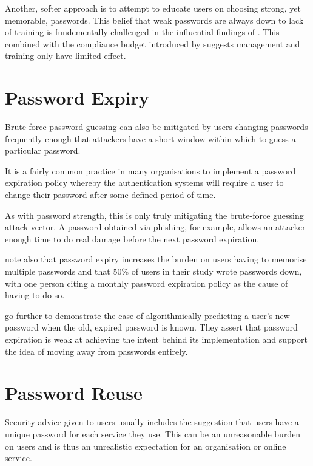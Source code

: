 \documentclass{report}
\begin{document}
Another, softer approach is to attempt to educate users
on choosing strong, yet memorable, passwords. This belief
that weak passwords are always down to lack of training
is fundementally challenged in the influential findings
of \textcite{adams1999users}. This combined with the
compliance budget introduced by \textcite{beautement2009compliance}
suggests management and training only have limited effect.

\section{Password Expiry}

Brute-force password guessing can also be mitigated by
users changing passwords frequently enough that attackers
have a short window within which to guess a particular
password.

It is a fairly common practice in many organisations to
implement a password expiration policy whereby the
authentication systems will require a user to change their
password after some defined period of time.

As with password strength, this is only truly mitigating the
brute-force guessing attack vector. A password obtained via
phishing, for example, allows an attacker enough time to do
real damage before the next password expiration.

\textcite{adams1999users} note also that password expiry increases
the burden on users having to memorise multiple passwords and that
50\% of users in their study wrote passwords down, with one
person citing a monthly password expiration policy as the cause
of having to do so.

\textcite{zhang2010security} go further to demonstrate the ease of
algorithmically predicting a user's new password when the old,
expired password is known. They assert that password expiration
is weak at achieving the intent behind its implementation and
support the idea of moving away from passwords entirely.

\section{Password Reuse}

Security advice given to users usually includes the suggestion that users
have a unique password for each service they use. This can
be an unreasonable burden on users\parencite{florencio2014password}
and is thus an unrealistic expectation for an organisation or online
service.
\end{document}
